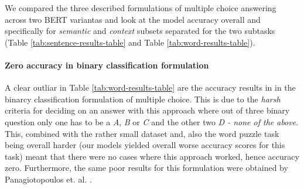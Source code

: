 We compared the three described formulations of multiple choice answering across two BERT variantas and look at the model accuracy overall and specifically for \emph{semantic} and \emph{context} subsets separated for the two subtasks (Table \ref{tab:sentence-results-table} and Table \ref{tab:word-results-table}).

\paragraph{Zero accuracy in binary classification formulation} %
A clear outliar in Table \ref{tab:word-results-table} are the accuracy results in in the binarcy classification formulation of multiple choice.
This is due to the \emph{harsh} criteria for deciding on an answer with this approach where out of three binary question only one has to be a \emph{A}, \emph{B} or \emph{C} and the other two \emph{D - none of the above}. This, combined with the rather small dataset and, also the word puzzle task being overall harder (our models yielded overall worse accuracy scores for this task) meant that there were no cases where this approach worked, hence accuracy zero.
Furthermore, the same poor results for this formulation were obtained by Panagiotopoulos et. al. \citep{ails-lab}.
